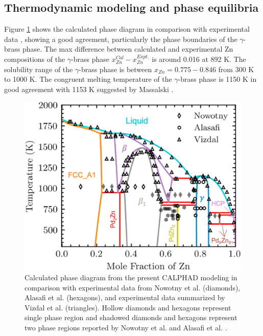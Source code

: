\subsection{Thermodynamic modeling and phase equilibria} \label{intermetallics:ssec:PdZneq}
Figure \ref{Intermetallics:fig:PdZnPhaseDiagram} shows the calculated phase diagram in comparison with experimental data \cite{vizdal2006experimental, nowotny1951beitrag, alasafi1978mischung}, showing a good agreement, particularly the phase boundaries of the $\gamma$-brass phase. The max difference between calculated and experimental Zn compositions of the $\gamma$-brass phase  $x_{Zn}^{Cal}-x_{Zn}^{Expt.}$ is around 0.016 at 892 K. The solubility range of the $\gamma$-brass phase is between $x_{Zn} = 0.775 - 0.846$ from 300 K to 1000 K. The congruent melting temperature of the $\gamma$-brass phase is 1150 K in good agreement with 1153 K suggested by Massalski \cite{massalski1986binary}.\\

\begin{figure}[H]
    \centering
    \includegraphics[width=0.6\linewidth]{intermetallics/Intermetallics-PdZnPhaseDiagram.jpg}
    \caption{Calculated phase diagram from the present CALPHAD modeling in comparison with experimental data from Nowotny et al. \cite{nowotny1951beitrag} (diamonds), Alasafi et al. \cite{alasafi1978mischung} (hexagons), and experimental data summarized by Vizdal et al. \cite{vizdal2006experimental} (triangles). Hollow diamonds and hexagons represent single phase region and shadowed diamonds and hexagons represent two phase regions reported by Nowotny et al. \cite{nowotny1951beitrag} and Alasafi et al. \cite{alasafi1978mischung}.}
    \label{Intermetallics:fig:PdZnPhaseDiagram}
\end{figure} 


